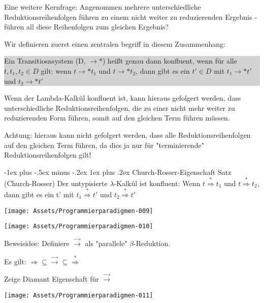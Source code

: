 \documentclass[10pt]{article}
\makeatletter
\renewcommand{\subsubsection}{\@startsection{subsubsection}{3}{0mm}%
                                {-1ex plus -.5ex minus -.2ex}%
                                {1ex plus .2ex}%
                                {\normalfont\small\bfseries}}
\makeatother
\begin{document}
\begin{itemize*}
\begin{itemize*}
  \end{itemize*}
  \item Eine weitere Kernfrage: Angenommen mehrere unterschiedliche Reduktionsreihenfolgen führen zu einem nicht weiter zu reduzierenden Ergebnis - \color{blue} führen all diese Reihenfolgen zum gleichen Ergebnis? \color{black}
  \item Wir definieren zuerst einen zentralen begriff in diesem Zusammenhang:
  \colorbox{lightgray}{\begin{minipage}[h]{1.0\linewidth}
      Ein Transitiosnsystem (D, $\rightarrow*$) heißt genau dann konfluent, wenn für alle $t,t_1,t_2 \in D$ gilt: wenn  $ t \rightarrow* t_1$ und $t \rightarrow* t_2$, dann gibt es ein $t' \in D$ mit $t_1 \rightarrow* t'$  		und $t_2 \rightarrow* t'$
    \end{minipage}}
  \item Wenn der Lambda-Kalkül konfluent ist, kann hieraus gefolgert werden, dass unterschiedliche Reduktionsreihenfolgen, die zu einer nicht mehr weiter zu reduzierenden Form führen, somit auf den gleichen Term führen müssen.
  \item Achtung: hieraus kann nicht gefolgert werden, dass alle Reduktionsreihenfolgen auf den gleichen Term führen, da dies ja nur für "terminierende" Reduktionsreihenfolgen gilt!
\end{itemize*}
\subsubsection{Church-Rosser-Eigenschaft}
\color{blue} Satz (Church-Rosser) \newline Der untypisierte $\lambda$-Kalkül ist konfluent: Wenn $t \stackrel{*}{\Rightarrow} t_1$ und $t \stackrel{*}{\Rightarrow} t_2$, dann gibt es ein t' mit $t_1 \stackrel{*}{\Rightarrow} t'$ und $t_2 \stackrel{*}{\Rightarrow} t'$

\begin{center}
  \texttt{[image: Assets/Programmierparadigmen-009]}
\end{center}
\begin{center}
  \texttt{[image: Assets/Programmierparadigmen-010]}
\end{center}
\color{black}
Beweisidee: Definiere $\stackrel{\rightarrow}{\rightarrow}$ als "parallele" $\beta$-Reduktion.
\begin{itemize*}
  \item Es gilt: $\Rightarrow \subseteq \stackrel{\rightarrow}{\rightarrow} \subseteq \stackrel{*}{\Rightarrow}$
  \item Zeige Diamant Eigenschaft für $\stackrel{\rightarrow}{\rightarrow}$
\end{itemize*}
\begin{center}
  \texttt{[image: Assets/Programmierparadigmen-011]}
  
\end{center}
\end{document}
